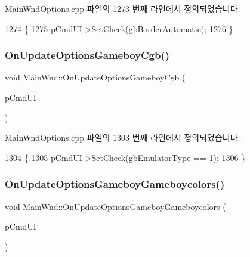 Main\+Wnd\+Options.\+cpp 파일의 1273 번째 라인에서 정의되었습니다.


\begin{DoxyCode}
1274 \{
1275   pCmdUI->SetCheck(\mbox{\hyperlink{gb_globals_8cpp_aa48c27f0812b59fa3489b9f026d9533b}{gbBorderAutomatic}});  
1276 \}
\end{DoxyCode}
\mbox{\label{class_main_wnd_a981614dcd952edf9cc56bea10a776116}} 
\subsubsection{\texorpdfstring{On\+Update\+Options\+Gameboy\+Cgb()}{OnUpdateOptionsGameboyCgb()}}
{\footnotesize\ttfamily void Main\+Wnd\+::\+On\+Update\+Options\+Gameboy\+Cgb (\begin{DoxyParamCaption}\item[{C\+Cmd\+UI $\ast$}]{p\+Cmd\+UI }\end{DoxyParamCaption})\hspace{0.3cm}{\ttfamily [protected]}}



Main\+Wnd\+Options.\+cpp 파일의 1303 번째 라인에서 정의되었습니다.


\begin{DoxyCode}
1304 \{
1305   pCmdUI->SetCheck(\mbox{\hyperlink{gb_globals_8cpp_aab449ed6ecf2bd502928a3d5aa5c54c4}{gbEmulatorType}} == 1);
1306 \}
\end{DoxyCode}
\mbox{\label{class_main_wnd_afc1d1c793e24da9855d3dfc0d37fcaaf}} 
\subsubsection{\texorpdfstring{On\+Update\+Options\+Gameboy\+Gameboycolors()}{OnUpdateOptionsGameboyGameboycolors()}}
{\footnotesize\ttfamily void Main\+Wnd\+::\+On\+Update\+Options\+Gameboy\+Gameboycolors (\begin{DoxyParamCaption}\item[{C\+Cmd\+UI $\ast$}]{p\+Cmd\+UI }\end{DoxyParamCaption})\hspace{0.3cm}{\ttfamily [protected]}}



